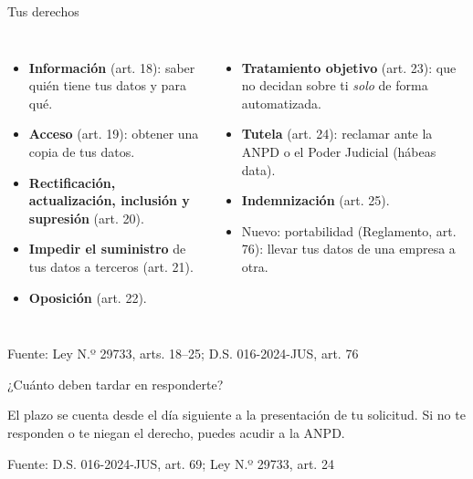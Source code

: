 \documentclass[aspectratio=169,11pt]{beamer}
\newcommand{\fuente}[1]{\par\vfill\hfill{\tiny\color{gray}Fuente: #1}}
\begin{document}
\begin{frame}{Tus derechos}
\begin{columns}[T]
\small
\begin{itemize}
  \item \textbf{Información} (art. 18): saber quién tiene tus datos y para qué.
  \item \textbf{Acceso} (art. 19): obtener una copia de tus datos.
  \item \textbf{Rectificación, actualización, inclusión y supresión} (art. 20).
  \item \textbf{Impedir el suministro} de tus datos a terceros (art. 21).
  \item \textbf{Oposición} (art. 22).
\end{itemize}
\small
\begin{itemize}
  \item \textbf{Tratamiento objetivo} (art. 23): que no decidan sobre ti \emph{solo} de forma automatizada.
  \item \textbf{Tutela} (art. 24): reclamar ante la ANPD o el Poder Judicial (hábeas data).
  \item \textbf{Indemnización} (art. 25).
  \item \alert{Nuevo: portabilidad} (Reglamento, art. 76): llevar tus datos de una empresa a otra.
\end{itemize}
\end{columns}
\fuente{Ley N.º 29733, arts. 18--25; D.S. 016-2024-JUS, art. 76}
\end{frame}

\begin{frame}{¿Cuánto deben tardar en responderte?}
\begin{center}
\end{center}
\small El plazo se cuenta desde el día siguiente a la presentación de tu solicitud. Si no te responden o te niegan el derecho, puedes acudir a la \alert{ANPD}.
\fuente{D.S. 016-2024-JUS, art. 69; Ley N.º 29733, art. 24}
\end{frame}
\end{document}
